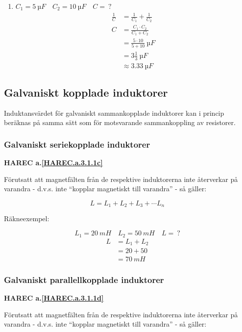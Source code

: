 \begin{enumerate}
  \item \(C_1 = 5\ µF \quad C_2 = 10\ µF \quad C =\ ?\)
    \begin{align*}
      \frac{1}{C} &= \frac{1}{C_1} + \frac{1}{C_2} \\
      C &= \frac{C_1 \cdot C_2}{C_1 + C_2} \\
      &= \frac{5 \cdot 10}{5 + 10}\ µF \\
      &= 3\frac{1}{3}\ µF \\
      &\approx 3.33\ µF
    \end{align*}
\end{enumerate}

\subsection{Galvaniskt kopplade induktorer}

Induktansvärdet för galvaniskt sammankopplade induktorer kan i princip
beräknas på samma sätt som för motsvarande sammankoppling av resistorer.

\subsubsection{Galvaniskt seriekopplade induktorer}
\textbf{HAREC a.\ref{HAREC.a.3.1.1c}\label{myHAREC.a.3.1.1c}}

Förutsatt att magnetfälten från de respektive induktorerna inte återverkar på
varandra - d.v.s. inte ``kopplar magnetiskt till varandra'' - så gäller:

\[L = L_1 + L_2 + L_3 + \cdots L_n\]

Räkneexempel:

\[L_1 = 20\ mH \quad L_2 = 50\ mH \quad L =\ ?\]
\begin{align*}
  L &= L_1 + L_2 \\
  & = 20 + 50 \\
  &= 70\ mH
\end{align*}

\subsubsection{Galvaniskt parallellkopplade induktorer}
\textbf{HAREC a.\ref{HAREC.a.3.1.1d}\label{myHAREC.a.3.1.1d}}

Förutsatt att magnetfälten från de respektive induktorerna inte återverkar på
varandra - d.v.s. inte ``kopplar magnetiskt till varandra'' - så gäller:

